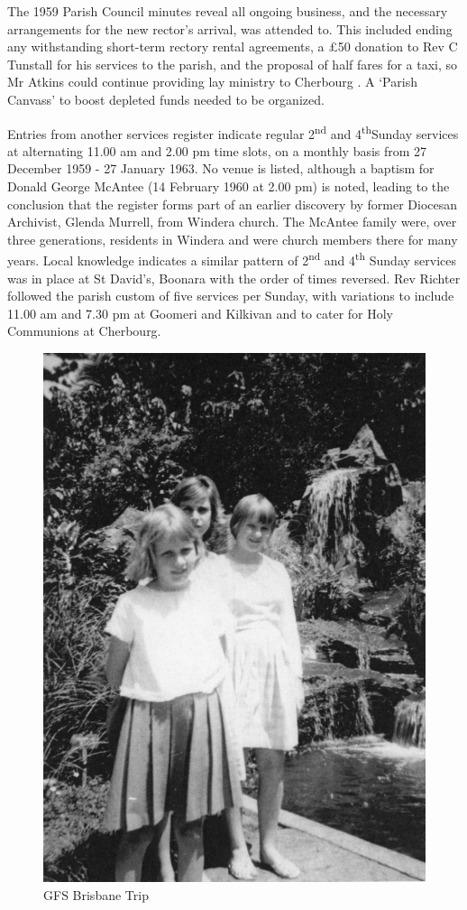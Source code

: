 The 1959 Parish Council minutes reveal all ongoing business, and the necessary arrangements for the new rector's arrival, was attended to. This included ending any withstanding short-term rectory rental agreements, a \pounds50 donation to Rev C Tunstall for his services to the parish, and the proposal of half fares for a taxi, so Mr Atkins could continue providing lay ministry to Cherbourg . A `Parish Canvass' to boost depleted funds needed to be organized.



Entries from another services register indicate regular 2\textsuperscript{nd} and 4\textsuperscript{th}Sunday services at alternating 11.00 am and 2.00 pm time slots, on a monthly basis from 27 December 1959 - 27 January 1963. No venue is listed, although a baptism for Donald George McAntee (14 February 1960 at 2.00 pm) is noted, leading to the conclusion that the register forms part of an earlier discovery by former Diocesan Archivist, Glenda Murrell, from Windera church. The McAntee family were, over three generations, residents in Windera and were church members there for many years. Local knowledge indicates a similar pattern of 2\textsuperscript{nd} and 4\textsuperscript{th} Sunday services was in place at St David's, Boonara with the order of times reversed. Rev Richter followed the parish custom of five services per Sunday, with variations to include 11.00 am and 7.30 pm at Goomeri and Kilkivan and to cater for Holy Communions at Cherbourg.









\begin{figure}
\begin{center}
\includegraphics[width=.6\linewidth,center]{../images/gfsBrisbaneTrip.jpg}
\caption{GFS Brisbane Trip}
\end{center}
\end{figure}




